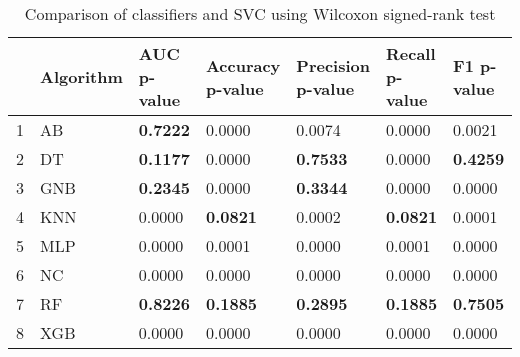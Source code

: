 \begin{table}
\footnotesize
\caption{Comparison of classifiers and SVC using Wilcoxon signed-rank test}
\label{tab:wilcoxon comparison}
\begin{tabular}{lllllll}
\hline
 & Algorithm & AUC p-value & Accuracy p-value & Precision p-value & Recall p-value & F1 p-value \\
\hline
1 & AB & \textbf{0.7222} & 0.0000 & 0.0074 & 0.0000 & 0.0021 \\
2 & DT & \textbf{0.1177} & 0.0000 & \textbf{0.7533} & 0.0000 & \textbf{0.4259} \\
3 & GNB & \textbf{0.2345} & 0.0000 & \textbf{0.3344} & 0.0000 & 0.0000 \\
4 & KNN & 0.0000 & \textbf{0.0821} & 0.0002 & \textbf{0.0821} & 0.0001 \\
5 & MLP & 0.0000 & 0.0001 & 0.0000 & 0.0001 & 0.0000 \\
6 & NC & 0.0000 & 0.0000 & 0.0000 & 0.0000 & 0.0000 \\
7 & RF & \textbf{0.8226} & \textbf{0.1885} & \textbf{0.2895} & \textbf{0.1885} & \textbf{0.7505} \\
8 & XGB & 0.0000 & 0.0000 & 0.0000 & 0.0000 & 0.0000 \\
\hline
\end{tabular}
\end{table}
